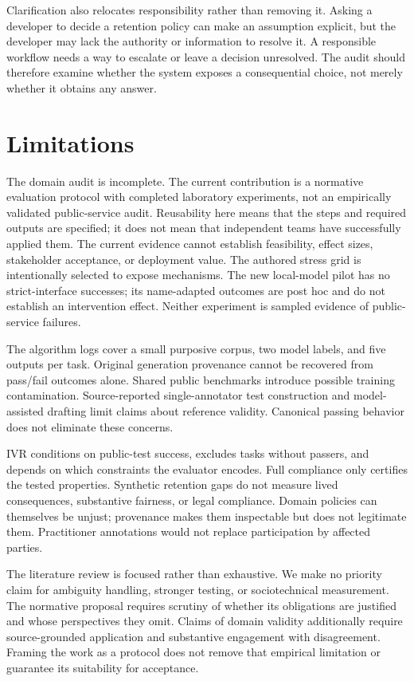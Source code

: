 \documentclass[manuscript,screen,review,anonymous]{acmart}
\begin{document}
Clarification also relocates responsibility rather than removing it. Asking a developer to decide a retention policy can make an assumption explicit, but the developer may lack the authority or information to resolve it. A responsible workflow needs a way to escalate or leave a decision unresolved. The audit should therefore examine whether the system exposes a consequential choice, not merely whether it obtains any answer.

\section{Limitations}
The domain audit is incomplete. The current contribution is a normative evaluation protocol with completed laboratory experiments, not an empirically validated public-service audit. Reusability here means that the steps and required outputs are specified; it does not mean that independent teams have successfully applied them. The current evidence cannot establish feasibility, effect sizes, stakeholder acceptance, or deployment value. The authored stress grid is intentionally selected to expose mechanisms. The new local-model pilot has no strict-interface successes; its name-adapted outcomes are post hoc and do not establish an intervention effect. Neither experiment is sampled evidence of public-service failures.

The algorithm logs cover a small purposive corpus, two model labels, and five outputs per task. Original generation provenance cannot be recovered from pass/fail outcomes alone. Shared public benchmarks introduce possible training contamination. Source-reported single-annotator test construction and model-assisted drafting limit claims about reference validity. Canonical passing behavior does not eliminate these concerns.

IVR conditions on public-test success, excludes tasks without passers, and depends on which constraints the evaluator encodes. Full compliance only certifies the tested properties. Synthetic retention gaps do not measure lived consequences, substantive fairness, or legal compliance. Domain policies can themselves be unjust; provenance makes them inspectable but does not legitimate them. Practitioner annotations would not replace participation by affected parties.

The literature review is focused rather than exhaustive. We make no priority claim for ambiguity handling, stronger testing, or sociotechnical measurement. The normative proposal requires scrutiny of whether its obligations are justified and whose perspectives they omit. Claims of domain validity additionally require source-grounded application and substantive engagement with disagreement. Framing the work as a protocol does not remove that empirical limitation or guarantee its suitability for acceptance.
\end{document}
